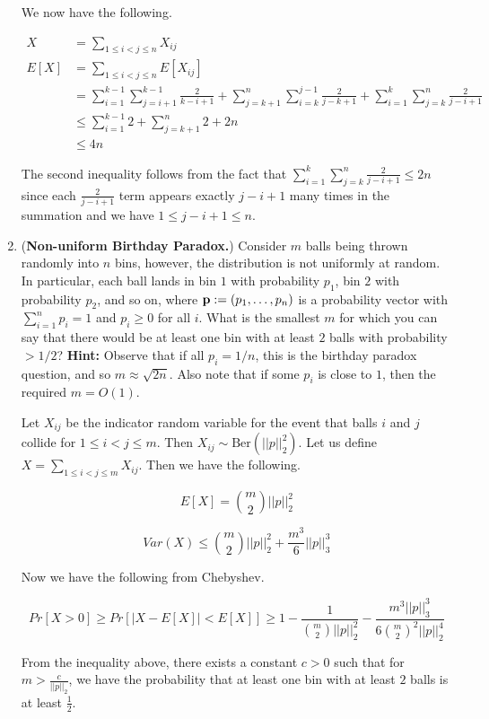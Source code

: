 \documentclass[11pt]{article}
\begin{document}
\begin{enumerate}
We now have the following.

\begin{align*}
X &= \sum_{1\le i< j\le n} X_{ij}\\
E[X] &= \sum_{1\le i< j\le n} E[X_{ij}]\\
&= \sum_{i=1}^{k-1}\sum_{j=i+1}^{k-1} \frac{2}{k-i+1} + \sum_{j=k+1}^n\sum_{i=k}^{j-1} \frac{2}{j-k+1} + \sum_{i=1}^k\sum_{j=k}^n \frac{2}{j-i+1}\\
&\le \sum_{i=1}^{k-1} 2 + \sum_{j=k+1}^n 2 + 2n\\
&\le 4n
\end{align*}

The second inequality follows from the fact that $\sum_{i=1}^k\sum_{j=k}^n \frac{2}{j-i+1} \le 2n$ since each $\frac{2}{j-i+1}$ term appears exactly $j-i+1$ many times in the summation and we have $1\le j-i+1\le n$.



\item ({\bf Non-uniform Birthday Paradox.}) Consider $m$ balls being thrown randomly into $n$ bins, however, the distribution is not uniformly at random.
In particular, each ball lands in bin $1$ with probability $p_1$, bin $2$ with probability $p_2$, and so on, where 
${\bf p} := (p_1,\ldots,p_n)$ is a probability vector with $\sum_{i=1}^n p_i = 1$ and $p_i \geq 0$ for all $i$. What is the smallest $m$ for which you can say that 
there would be at least one bin with at least $2$ balls with probability $>1/2$?
{\bf Hint:} Observe that if all $p_i = 1/n$, this is the birthday paradox question, and so $m \approx \sqrt{2n}$. Also note that if some $p_i$ is close to $1$, then the required $m = O(1)$.

\Sol Let $X_{ij}$ be the indicator random variable for the event that balls $i$ and $j$ collide for $1\le i<j\le m$. Then $X_{ij} \sim \text{Ber}(||p||_2^2)$. Let us define $X = \sum_{1\le i<j\le m} X_{ij}$. Then we have the following.

\[ E[X] = {m\choose 2}||p||_2^2 \]

\[ Var(X) \le {m\choose 2}||p||_2^2 + \frac{m^3}{6}||p||_3^3 \]

Now we have the following from Chebyshev.

\[ Pr[X >0] \ge Pr[|X-E[X]|< E[X]] \ge 1 - \frac{1}{{m\choose 2}||p||_2^2} - \frac{m^3||p||_3^3}{6{m\choose 2}^2||p||_2^4} \]

From the inequality above, there exists a constant $c>0$ such that for $m>\frac{c}{||p||_2}$, we have the probability that at least one bin with at least $2$ balls is at least $\frac{1}{2}$.


\end{enumerate}
\end{document}
